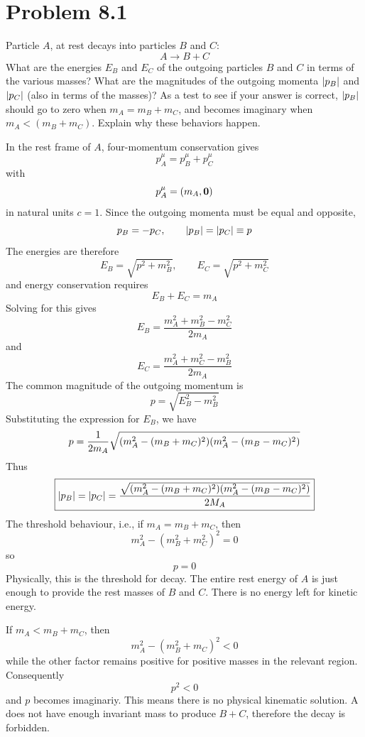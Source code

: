 \documentclass[12pt,a4paper]{article}
\begin{document}
	
	\section*{
		Problem 8.1
	}
	\begin{problem}
		Particle $A$, at rest decays into particles $B$ and $C$:
		\begin{equation}
			\label{eq:decay}
			A \to B+C
		\end{equation}
		What are the energies $E_B$ and $E_C$ of the outgoing particles $B$ and $C$ in 
		terms of the various masses? What are the magnitudes of the outgoing 
		momenta $\abs{p_B}$ and $\abs{p_C}$ (also in terms of the masses)? As a test to see if 
		your answer is correct, $\abs{p_B}$
		should go to zero when $m_A = m_B + m_C$, 
		and becomes imaginary when $m_A < (m_B + m_C)$. Explain why these 
		behaviors happen.
	\end{problem}
	\begin{solution_pset}
		\nocite{flores2026}
		In the rest frame of $A$, four-momentum conservation gives
		\[
			p^\mu_A = p^\mu_B + p_C^\mu
		\]
		with
		\[
			p^\mu_A = (m_A,\vb{0})
		\]
		in natural units $c=1$. Since the outgoing momenta must be equal and opposite,
		\[
			p_B = -p_C, \qquad \abs{p_B}=\abs{p_C}\equiv p
		\]
		The energies are therefore
		\[
			E_B = \sqrt{p^2 + m_B^2},\qquad E_C = \sqrt{p^2 + m_C^2}
		\]
		and energy conservation requires
		\[
			E_B + E_C = m_A
		\]
		Solving for this gives
		\[
			\boxed{
				E_B = \frac{m_A^2 + m_B^2 - m^2_C}{2m_A} 
			}
		\]
		and
		\[
			\boxed{
				E_C = \frac{m_A^2 + m_C^2 -m_B^2}{2m_A} 
			}
		\]
		The common magnitude of the outgoing momentum is
		\[
			p = \sqrt{E_B^2 - m_B^2}
		\]
		Substituting the expression for $E_B$, we have
		\[
			p = \frac{1}{2m_A}\sqrt{
				\pqty{
					m_A^2 - (m_B + m_C)^2
				}
				\pqty{
					m_A^2 - (m_B - m_C)^2
				}
			} 
		\]
		Thus
		\[
			\boxed{
				\abs{p_B} = \abs{p_C} = 
				\frac{
					\sqrt{
						\pqty{
							m_A^2 - (m_B + m_C)^2
						}
						\pqty{
							m_A^2 - (m_B - m_C)^2
						}
					}
				}{
					2M_A
				} 
			}
		\]
		The threshold behaviour, i.e., if $m_A = m_B + m_C$, then
		\[
			m_A^2 - (m_B^2 + m_C^2)^2 = 0
		\]
		so
		\[
			p = 0
		\]
		Physically, this is the threshold for decay.
		The entire rest energy of $A$ is just enough
		to provide the rest masses of $B$ and $C$. There is 
		no energy left for kinetic energy. 

		If $m_A < m_B + m_C$, then
		\[
			m_A^2 - (m_B^2 + m_C)^2 < 0
		\]
		while the other factor remains positive for positive masses
		in the relevant region. Consequently
		\[
			p^2 < 0
		\]
		and $p$ becomes imaginariy. This means there is no physical kinematic solution.
		A does not have enough invariant mass to produce $B+C$, therefore the decay 
		is forbidden.
	\end{solution_pset}
	\newpage
\end{document}
